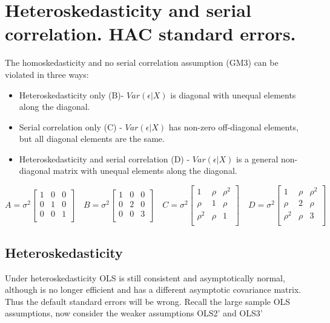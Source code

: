 \documentclass[DIV=14,titlepage=false]{scrreprt}
\begin{document}
\vspace{-10pt}
\setcounter{chapter}{7}

\chapter{Heteroskedasticity and serial correlation. HAC standard errors.}
\vspace{-10pt}
The homoskedasticity and no serial correlation assumption (GM3) can be violated in three ways:
\begin{itemize}
    \item Heteroskedasticity only  (B)- $Var(\epsilon|X)$ is diagonal with unequal elements along the diagonal.
    \item Serial correlation only (C) - $Var(\epsilon|X)$ has non-zero off-diagonal elements, but all diagonal elements are the same.
    \item Heteroskedasticity and serial correlation (D) - $Var(\epsilon|X)$ is a general non-diagonal matrix with unequal elements along the diagonal.
\end{itemize}
\[ A = \sigma^2 \begin{bmatrix}
    1&0&0\\
    0&1&0\\
    0&0&1\\
\end{bmatrix} \quad 
B = \sigma^2 \begin{bmatrix}
    1&0&0\\
    0&2&0\\
    0&0&3\\
\end{bmatrix} \quad 
C = \sigma^2 \begin{bmatrix}
    1&\rho&\rho^2\\
    \rho&1&\rho\\
    \rho^2&\rho&1\\
\end{bmatrix} \quad
D = \sigma^2 \begin{bmatrix}
    1&\rho&\rho^2\\
    \rho&2&\rho\\
    \rho^2&\rho&3\\
\end{bmatrix}
\]
\section{Heteroskedasticity}
Under heteroskedasticity OLS is still consistent and asymptotically normal, although is no longer efficient and has a different asymptotic covariance matrix. Thus the default standard errors will be wrong. Recall the large sample OLS assumptions, now consider the weaker assumptions OLS2' and OLS3'
\end{document}
